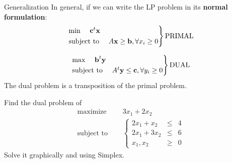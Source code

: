\documentclass[c]{beamer}
\begin{document}
\begin{frame}{Generalization}
In general, if we can write the LP problem in its {\bf normal formulation}:
\[
\begin{rcases}
\text{min }\quad\textbf{c}^t \textbf{x}\\
\text{subject to }\quad A\textbf{x}\geq \textbf{b}, \forall x_i\geq0
\end{rcases} \text{PRIMAL}
\]

\[
\begin{rcases}
\text{max }\quad\textbf{b}^t \textbf{y}\\
\text{subject to }\quad A^t\textbf{y}\leq \textbf{c}, \forall y_i\geq0
\end{rcases} \text{DUAL}
\]
The dual problem is a transposition of the primal problem.
\end{frame}

\begin{frame}{}
\begin{Exercise}
  Find the dual problem of
  \begin{equation*}
  \begin{aligned}
    \text{maximize } \quad & 3x_1 +2x_2 \\
    \text{subject to }\quad &
    \left\{
    \begin{array}{rcl}
      2x_1+x_2 &\leq &4 \\
      2x_1+3x_2 &\leq &6 \\
      x_1,x_2 &\geq& 0
    \end{array}
    \right.
  \end{aligned}
\end{equation*}
Solve it graphically and using Simplex.
\end{Exercise}
\end{frame}
\end{document}
